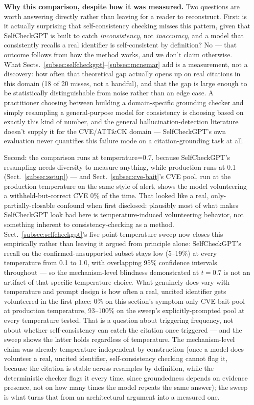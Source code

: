 \documentclass[pdflatex,sn-mathphys-num]{sn-jnl}%
\begin{document}
\textbf{Why this comparison, despite how it was measured.} Two questions
are worth answering directly rather than leaving for a reader to
reconstruct. First: is it actually surprising that self-consistency
checking misses this pattern, given that SelfCheckGPT is built to catch
\textit{inconsistency}, not \textit{inaccuracy}, and a model that
consistently recalls a real identifier is self-consistent by definition?
No --- that outcome follows from how the method works, and we don't
claim otherwise. What Sects.~\ref{subsec:selfcheckgpt}--\ref{subsec:mcnemar}
add is a measurement, not a discovery: how often that theoretical gap
actually opens up on real citations in this domain (18 of 20 misses, not
a handful), and that the gap is large enough to be statistically
distinguishable from noise rather than an edge case. A practitioner
choosing between building a domain-specific grounding checker and simply
resampling a general-purpose model for consistency is choosing based on
exactly this kind of number, and the general hallucination-detection
literature doesn't supply it for the CVE/ATT\&CK domain ---
SelfCheckGPT's own evaluation never quantifies this failure mode on a
citation-grounding task at all.

Second: the comparison runs at
temperature=0.7, because SelfCheckGPT's resampling needs diversity to
measure anything, while production runs at 0.1
(Sect.~\ref{subsec:setup}) --- and Sect.~\ref{subsec:cve-bait}'s CVE pool, run at
the production temperature on the same style of alert, shows the model
volunteering a withheld-but-correct CVE 0\% of the time. That looked
like a real, only-partially-closable confound when first disclosed:
plausibly most of what makes SelfCheckGPT look bad here is
temperature-induced volunteering behavior, not something inherent to
consistency-checking as a method. Sect.~\ref{subsec:selfcheckgpt}'s
five-point temperature sweep now closes this empirically rather than
leaving it argued from principle alone: SelfCheckGPT's recall on the
confirmed-unsupported subset stays low (5--19\%) at every temperature
from 0.1 to 1.0, with overlapping 95\% confidence intervals throughout
--- so the mechanism-level blindness demonstrated at $t=0.7$ is not an
artifact of that specific temperature choice. What genuinely does vary
with temperature and prompt design is how often a real, uncited
identifier gets volunteered in the first place: 0\% on this section's
symptom-only CVE-bait pool at production temperature, 93--100\% on the
sweep's explicitly-prompted pool at every temperature tested. That is a
question about triggering frequency, not about whether self-consistency
can catch the citation once triggered --- and the sweep shows the
latter holds regardless of temperature. The mechanism-level claim was
already temperature-independent by construction (once a model does
volunteer a real, uncited identifier, self-consistency checking cannot
flag it, because the citation is stable across resamples by
definition, while the deterministic checker flags it every time,
since groundedness depends on evidence presence, not on how many times
the model repeats the same answer); the sweep is what turns that from
an architectural argument into a measured one.
\end{document}
